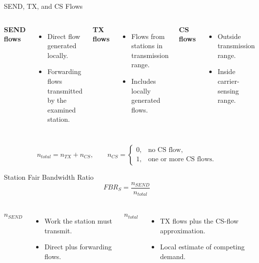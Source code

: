 \begin{frame}{SEND, TX, and CS Flows}
\begin{columns}[T,onlytextwidth]
\textbf{SEND flows}
\begin{itemize}
\item Direct flow generated locally.
\item Forwarding flows transmitted by the examined station.
\end{itemize}
\textbf{TX flows}
\begin{itemize}
\item Flows from stations in transmission range.
\item Includes locally generated flows.
\end{itemize}
\textbf{CS flows}
\begin{itemize}
\item Outside transmission range.
\item Inside carrier-sensing range.
\end{itemize}
\end{columns}
\vspace{0.45cm}
\[
n_{total}=n_{TX}+n_{CS},\qquad
n_{CS}=\begin{cases}0,&\text{no CS flow},\\1,&\text{one or more CS flows.}\end{cases}
\]
\end{frame}

\begin{frame}{Station Fair Bandwidth Ratio}
\[
\boxed{FBR_S=\frac{n_{SEND}}{n_{total}}}
\]
\begin{columns}[T,onlytextwidth]
\textbf{$n_{SEND}$}
\begin{itemize}
\item Work the station must transmit.
\item Direct plus forwarding flows.
\end{itemize}
\textbf{$n_{total}$}
\begin{itemize}
\item TX flows plus the CS-flow approximation.
\item Local estimate of competing demand.
\end{itemize}
\end{columns}
\vspace{0.25cm}
\end{frame}

